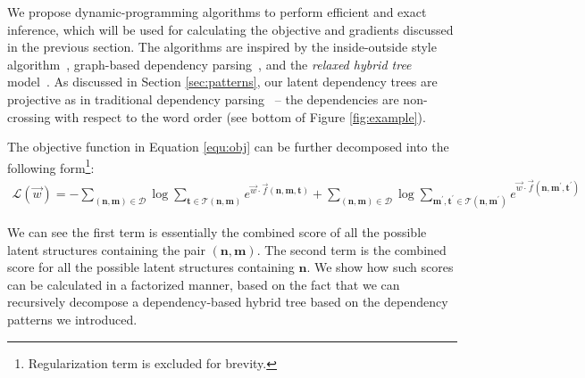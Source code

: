 We propose  dynamic-programming algorithms to perform efficient and exact inference, which will be used for calculating the objective and gradients discussed in the previous section.
The algorithms are inspired by the inside-outside style algorithm~\cite{baker1979trainable}, graph-based dependency parsing~\cite{eisner2000bilexical,koo2010efficient,shi2017fast}, and the \textit{relaxed hybrid tree} model~\cite{lu2014semantic,lu2015constrained}. 
As discussed in Section \ref{sec:patterns}, our latent dependency trees are {projective} as in traditional dependency parsing~\cite{eisner1996three,nivre2004deterministic,mcdonald2005online} -- the dependencies are non-crossing with respect to the word order (see bottom of Figure \ref{fig:example}). 


The objective function in Equation \ref{equ:obj} can be further decomposed into the following form\footnote{Regularization term is excluded for brevity.}:
\begin{equation}
\begin{split}
\mathcal{L} (\vec{w})
=
-
\sum_{(\boldsymbol{n}, \boldsymbol{m}) \in \mathcal{D}}
\log \sum_{\boldsymbol{t} \in \mathcal{T} (\boldsymbol{n}, \boldsymbol{m}) }	
e ^{\vec{w} \cdot \vec{f} (\boldsymbol{n}, \boldsymbol{m}, \boldsymbol{t})} 
+
\sum_{(\boldsymbol{n}, \boldsymbol{m}) \in \mathcal{D}}
\!\!\!
\log
\sum_{\boldsymbol{m}^\prime, \boldsymbol{t}^\prime \in \mathcal{T}(\boldsymbol{n}, \boldsymbol{m}^\prime )} 
e^{\vec{w} \cdot \vec{f} (\boldsymbol{n}, \boldsymbol{m}^\prime, \boldsymbol{t}^\prime)}\nonumber
\end{split}
\label{equ:objdecompose}
\end{equation}

We can see the first term is essentially the combined score of all the possible latent structures containing the pair $(\boldsymbol{n}, \boldsymbol{m})$. 
The second term is the combined score for all the possible latent structures containing $\boldsymbol{n}$. 
We show how such scores can be calculated in a factorized manner, based on the fact that we can recursively decompose a dependency-based hybrid tree based on the dependency patterns we introduced.

